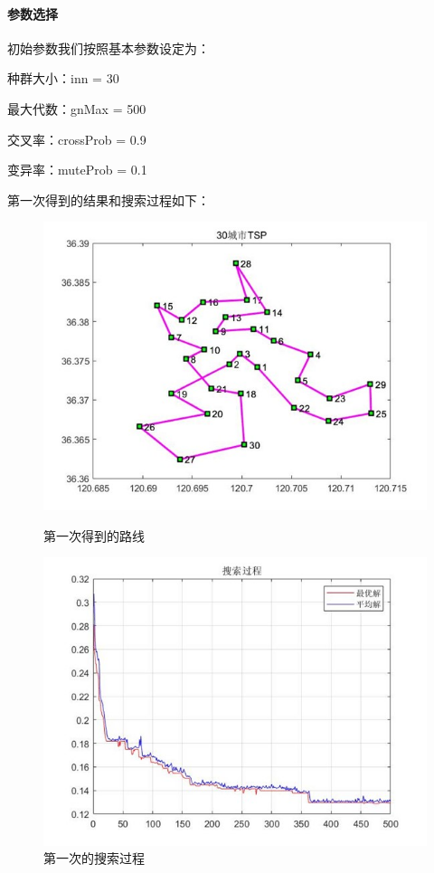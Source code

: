\documentclass{article}
\begin{document}
\paragraph{参数选择}
初始参数我们按照基本参数设定为：

种群大小：inn = 30

最大代数：gnMax = 500

交叉率：crossProb = 0.9

变异率：muteProb = 0.1

第一次得到的结果和搜索过程如下：
\vspace{0.5ex}
\begin{figure}[hbt]
	\begin{minipage}[t]{0.5\textwidth}
		\centering
		\includegraphics[scale=0.55]{7.1.jpg}
		\caption{第一次得到的路线}
	\end{minipage}
	\qquad
	\begin{minipage}[t]{0.5\textwidth}
		\centering
		\includegraphics[scale=0.55]{7.2.jpg}
		\caption{第一次的搜索过程}
	\end{minipage}
\end{figure}
\vspace{0.5ex}
\end{document}
